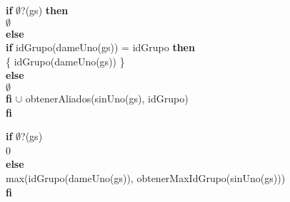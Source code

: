 \begin{tad}{}
{	\textbf{if} $ \emptyset $?(gs) \textbf{then} \\
		\hspace*{20pt}$ \emptyset $	\\
	\textbf{else} \\
		\hspace*{20pt}\textbf{if} idGrupo(dameUno(gs)) = idGrupo \textbf{then} \\
			\hspace*{40pt} \{ idGrupo(dameUno(gs)) \}	\\
		\hspace*{20pt}\textbf{else} \\
			\hspace*{40pt} $ \emptyset $ \\
		\hspace*{20pt}\textbf{fi} $\cup$ obtenerAliados(sinUno(gs), idGrupo)  \\
	\textbf{fi} \\


 }

\vspace{3 mm}


\vspace{3 mm}

{
	\textbf{if} $\emptyset$?(gs) \\
	\hspace*{20pt} 0\\
	\textbf{else} \\
	\hspace*{20pt}	max(idGrupo(dameUno(gs)), obtenerMaxIdGrupo(sinUno(gs))) \\
	\textbf{fi} \\
}

\vspace{3 mm}


\end{tad}
